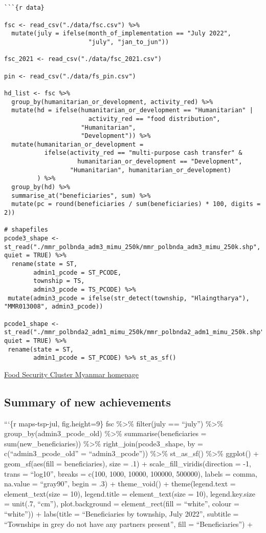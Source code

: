 \documentclass[
]{article}
\begin{document}
\begin{verbatim}


```{r data}

fsc <- read_csv("./data/fsc.csv") %>% 
  mutate(july = ifelse(month_of_implementation == "July 2022", 
                       "july", "jan_to_jun")) 

fsc_2021 <- read_csv("./data/fsc_2021.csv")

pin <- read_csv("./data/fs_pin.csv")

hd_list <- fsc %>% 
  group_by(humanitarian_or_development, activity_red) %>%
  mutate(hd = ifelse(humanitarian_or_development == "Humanitarian" |
                       activity_red == "food distribution", 
                     "Humanitarian", 
                     "Development")) %>% 
  mutate(humanitarian_or_development = 
           ifelse(activity_red == "multi-purpose cash transfer" &
                    humanitarian_or_development == "Development",
                  "Humanitarian", humanitarian_or_development)
         ) %>%
  group_by(hd) %>% 
  summarise_at("beneficiaries", sum) %>%
  mutate(pc = round(beneficiaries / sum(beneficiaries) * 100, digits = 2))

# shapefiles
pcode3_shape <- st_read("./mmr_polbnda_adm3_mimu_250k/mmr_polbnda_adm3_mimu_250k.shp", quiet = TRUE) %>% 
  rename(state = ST, 
        admin1_pcode = ST_PCODE,
        township = TS,
        admin3_pcode = TS_PCODE) %>% 
 mutate(admin3_pcode = ifelse(str_detect(township, "Hlaingtharya"), "MMR013008", admin3_pcode))

pcode1_shape <- st_read("./mmr_polbnda2_adm1_mimu_250k/mmr_polbnda2_adm1_mimu_250k.shp", quiet = TRUE) %>% 
 rename(state = ST, 
        admin1_pcode = ST_PCODE) %>% st_as_sf()
\end{verbatim}

\href{https://food-security-cluster-myanmar.github.io/}{Food Security
Cluster Myanmar homepage}

\hypertarget{summary-of-new-achievements}{%
\subsection{Summary of new
achievements}\label{summary-of-new-achievements}}

```\{r maps-tsp-jul, fig.height=9\} fsc \%\textgreater\% filter(july ==
``july'') \%\textgreater\% group\_by(admin3\_pcode\_old)
\%\textgreater\% summarise(beneficiaries = sum(new\_beneficiaries))
\%\textgreater\% right\_join(pcode3\_shape, by =
c(``admin3\_pcode\_old'' = ``admin3\_pcode'')) \%\textgreater\%
st\_as\_sf() \%\textgreater\% ggplot() + geom\_sf(aes(fill =
beneficiaries), size = .1) + scale\_fill\_viridis(direction = -1, trans
= ``log10'', breaks = c(100, 1000, 10000, 100000, 500000), labels =
comma, na.value = ``gray90'', begin = .3) + theme\_void() +
theme(legend.text = element\_text(size = 10), legend.title =
element\_text(size = 10), legend.key.size = unit(.7, ``cm''),
plot.background = element\_rect(fill = ``white'', colour = ``white'')) +
labs(title = ``Beneficiaries by township, July 2022'', subtitle =
``Townships in grey do not have any partners present'', fill =
``Beneficiaries'') +
\end{document}
